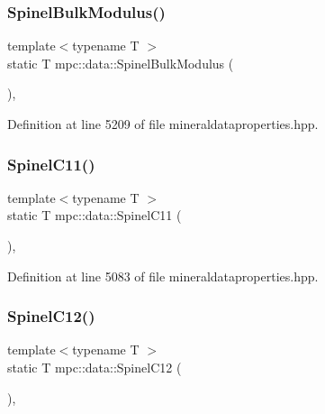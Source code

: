 \subsubsection{\texorpdfstring{Spinel\+Bulk\+Modulus()}{SpinelBulkModulus()}}
{\footnotesize\ttfamily template$<$typename T $>$ \\
static T mpc\+::data\+::\+Spinel\+Bulk\+Modulus (\begin{DoxyParamCaption}{ }\end{DoxyParamCaption})\hspace{0.3cm}{\ttfamily [inline]}, {\ttfamily [static]}}



Definition at line 5209 of file mineraldataproperties.\+hpp.

\mbox{\label{namespacempc_1_1data_a8aacfda816418a9bc1ab2f929dd07d6a}} 
\subsubsection{\texorpdfstring{Spinel\+C11()}{SpinelC11()}}
{\footnotesize\ttfamily template$<$typename T $>$ \\
static T mpc\+::data\+::\+Spinel\+C11 (\begin{DoxyParamCaption}{ }\end{DoxyParamCaption})\hspace{0.3cm}{\ttfamily [inline]}, {\ttfamily [static]}}



Definition at line 5083 of file mineraldataproperties.\+hpp.

\mbox{\label{namespacempc_1_1data_a47095ac1f8a62911de507d88df59600b}} 
\subsubsection{\texorpdfstring{Spinel\+C12()}{SpinelC12()}}
{\footnotesize\ttfamily template$<$typename T $>$ \\
static T mpc\+::data\+::\+Spinel\+C12 (\begin{DoxyParamCaption}{ }\end{DoxyParamCaption})\hspace{0.3cm}{\ttfamily [inline]}, {\ttfamily [static]}}



